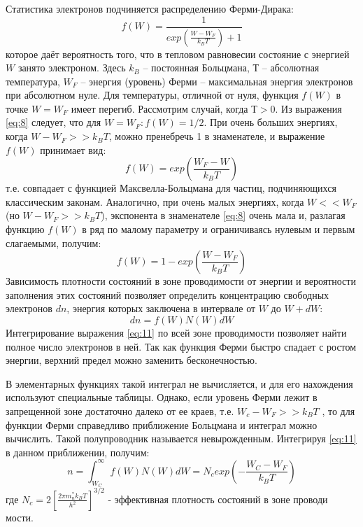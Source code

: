 Статистика электронов подчиняется распределению Ферми-Дирака:   
\begin{equation}
	f(W) = \frac{1}{exp (\frac{W-W_F}{k_B T})+1}
	\label{eq:8}
\end{equation}
которое даёт вероятность того, что в тепловом равновесии состояние с энергией $W$ занято электроном. Здесь $k_B$ –
постоянная Больцмана, $Т$ – абсолютная температура, $W_F$ – энергия (уровень) Ферми – максимальная энергия электронов при
абсолютном нуле. Для температуры, отличной от нуля, функция $f(W)$ в точке $W = W_F$ имеет перегиб. Рассмотрим случай,
когда $Т > 0$. Из выражения \eqref{eq:8} следует, что для $W=W_F: f(W) =1/2$. При очень больших энергиях, когда $ W-W_F
>> k_B T $, можно пренебречь 1 в знаменателе, и выражение $f(W)$ принимает вид:
\begin{equation}
	f(W) = exp (\frac{W_F-W}{k_B T})
	\label{eq:9}
\end{equation} 
т.е. совпадает с функцией Максвелла-Больцмана для частиц, подчиняющихся классическим законам. Аналогично, при очень
малых энергиях, когда $W<<W_F$ (но $W-W_F>>k_B T$), экспонента в знаменателе \eqref{eq:8} очень мала и, разлагая функцию $f(W)$ в ряд по
малому параметру и ограничиваясь нулевым и первым слагаемыми, получим: 
\begin{equation}
	f(W) = 1 - exp( \frac{W-W_F}{k_BT})
	\label{eq:10}
\end{equation}
Зависимость плотности состояний в зоне проводимости от энергии и вероятности заполнения этих состояний позволяет
определить концентрацию свободных электронов $dn$, энергия которых заключена в интервале от $W$ до $W+dW$:
\begin{equation}
	dn = f(W) N(W)dW
	\label{eq:11}
\end{equation}
Интегрирование выражения \eqref{eq:11} по всей зоне проводимости позволяет найти полное число электронов в ней. Так как функция
Ферми быстро спадает с ростом энергии, верхний предел можно заменить бесконечностью. 

В элементарных функциях такой интеграл не вычисляется, и для его нахождения используют специальные таблицы. Однако, если
уровень Ферми лежит в запрещенной зоне достаточно далеко от ее краев, т.е. $W_c - W_F>>k_B T$ , то для функции Ферми
справедливо приближение Больцмана и интеграл можно вычислить. Такой полупроводник называется невырожденным. Интегрируя
\eqref{eq:11} в данном приближении, получим: 
\begin{equation}
	n=\int_{W_{C}}^{\infty} f(W) N(W) d W=N_{c} exp(-\frac{W_C-W_F}{k_B T})
	\label{eq:12}
\end{equation}
где $N_{c}=2\left[\frac{2 \pi m_{n}^{*} k_{B} T}{h^{2}}\right]^{3 / 2}$ - эффективная плотность состояний в зоне проводи
мости.

